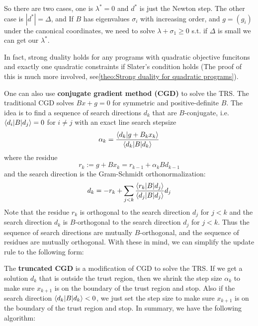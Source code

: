 \documentclass[a4paper]{mynotes}
\begin{document}
So there are two cases, one is $\lambda^*=0$ and $d^*$ is just the Newton step. The other case is $|d^*|=\Delta$, and 
If $B$ has  eigenvalues $\sigma_i$ with increasing order, and $g=(g_i)$ under the canonical coordinates, we need to solve $\lambda+\sigma_1\ge 0$ s.t. 
if $\Delta$ is small we can get our $\lambda^*$.

In fact, 
 strong duality holds for any programs with  quadratic objective funcitons and exactly one quadratic constraints if Slater's condition holds (The proof of this is much more involved, see\ref{theo:Strong duality for quadratic programs}). 

One can also use \textbf{conjugate gradient method (CGD)} to solve the TRS. The traditional CGD solves $Bx+g=0$ for symmetric and positive-definite $B$. The idea is to find a sequence of search directions $d_k$ that are $B$-conjugate, i.e. $\braket{d_i|B|d_j}=0$ for $i\neq j$ with an exact line search stepsize $$\alpha_k=\frac{\braket{d_k|g+B_kx_k}}{\braket{d_k|B|d_k}}$$  where
the residue $$r_k:=g+Bx_k=r_{k-1}+\alpha_kBd_{k-1}$$ and the search direction is the Gram-Schmidt orthonormalization: $$d_k=-r_k+\sum_{j<k} \frac{\braket{r_k|B|d_j}}{\braket{d_j|B|d_{j}}}d_j$$Note that the residue $r_k$ is orthogonal to the search direction $d_j$ for $j<k$ and the search direction $d_k$ is $B$-orthogonal to the search direction $d_j$ for $j<k$. Thus the sequence of search directions are mutually $B$-orthogonal, and the sequence of residues are mutually orthogonal. With these in mind, we can simplify the update rule to the following form: 

The \textbf{truncated CGD} is a modification of CGD to solve the TRS. If we get a solution $d_k$ that is outside the trust region, then we shrink the step size $\alpha_k$ to make sure $x_{k+1}$ is on the boundary of the trust region and stop. Also if the search direction $\braket{d_k|B|d_k}<0$, we just set the step size to make sure $x_{k+1}$ is on the boundary of the trust region and stop. In summary, we have the following algorithm:
\end{document}
